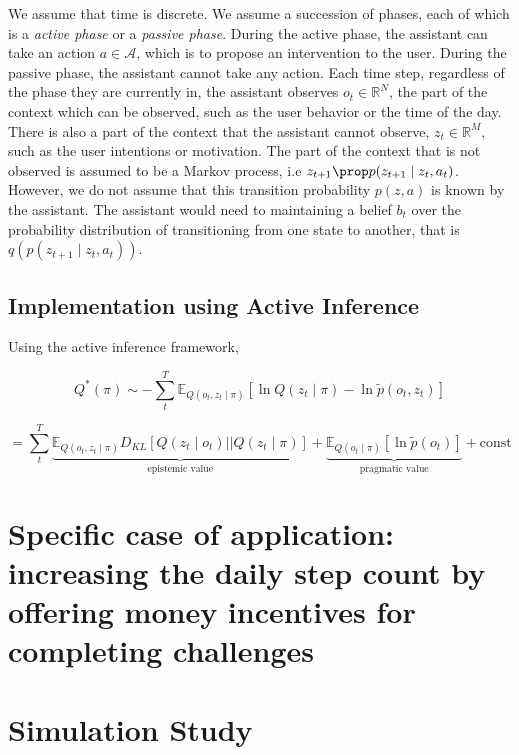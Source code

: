 \documentclass[manuscript,screen,review]{acmart}
\begin{document}
We assume that time is discrete. We assume a succession of phases, each of which is a \textit{active phase} or a
\textit{passive phase}. During the active phase, the assistant can take an action $a \in \mathcal{A}$, which is to
propose an intervention to the user. During the passive phase, the assistant cannot take any action.
Each time step, regardless of the phase they are currently in, the assistant observes $o_t \in \mathbb{R}^N$,
the part of the context which can be observed, such as the user behavior or the time of the day. There is also a part
 of the context that the assistant cannot observe,
$z_t \in \mathbb{R}^M$, such as the user intentions or motivation. The part of the context that is not observed is
assumed to be a Markov process, i.e $z_{t+1} \prop p(z_{t+1} \mid z_t, a_t)$. However, we do not assume that this
transition
probability
$p(z, a)$ is known by the assistant. The assistant would need to maintaining a belief $b_t$ over the probability
distribution of transitioning from one state to another, that is $q(p(z_{t+1} \mid z_t, a_t))$.

\subsection{Implementation using Active Inference}

Using the active inference framework,

\begin{equation}
Q^*(\pi) \sim - \sum_{t}^{T} \mathbb E_{Q(o_t, z_t \mid \pi)} \left[\ln Q(z_t \mid \pi) - \ln \tilde p(o_t, z_t) \right]
\end{equation}

\begin{equation}
    = \sum_{t}^{T}  \underbrace{ \mathbb E_{Q(o_t, z_t \mid \pi)} D_{KL}\left[ Q(z_t \mid o_t) || Q(z_t \mid \pi) \right] }_{ \text{epistemic value} }
    + \underbrace{ \mathbb E_{Q(o_t \mid \pi) } \left[ \ln \tilde p(o_t) \right]}_{ \text{pragmatic value} } + \text{const}
\end{equation}

\section{Specific case of application: increasing the daily step count by offering money incentives for completing
challenges}





\section{Simulation Study}
\end{document}
